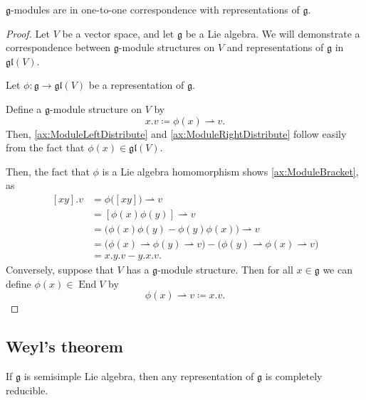 \documentclass{article}
\newcommand{\lb}[1]{\ensuremath{\left[{#1}\right]}}
\DeclareMathOperator{\End}{End}
\newcommand{\frkg}{{\ensuremath{\mathfrak{g}}}}
\newcommand{\glalg}{\ensuremath{\mathfrak{gl}}}
\begin{document}
\begin{proposition}
    $\frkg$-modules are in one-to-one correspondence with representations of $\frkg$.
\end{proposition}

\begin{proof}
    Let $V$ be a vector space, and let $\frkg$ be a Lie algebra.
    We will demonstrate a correspondence between $\frkg$-module structures on $V$ and representations of $\frkg$ in $\glalg(V)$.

    Let $\phi: \frkg \to \glalg(V)$ be a representation of $\frkg$.

    Define a $\frkg$-module structure on $V$ by
    \[
        x.v
        \coloneq
        \phi(x) \rightharpoonup v.
    \]
    Then, \ref{ax:ModuleLeftDistribute} and \ref{ax:ModuleRightDistribute} follow easily from the fact that $\phi(x) \in \glalg(V)$.

    Then, the fact that $\phi$ is a Lie algebra homomorphism shows \ref{ax:ModuleBracket}, as
    \begin{align*}
        \lb{xy}.v
        &=
        \phi\Big(\lb{xy}\Big) \rightharpoonup v
        \\
        &=
        \lb{\phi(x)\phi(y)} \rightharpoonup v
        \\
        &=
        \Big(
            \phi(x)\phi(y) - \phi(y)\phi(x)
        \Big)
        \rightharpoonup v
        \\
        &=
        \Big(
            \phi(x) \rightharpoonup \phi(y) \rightharpoonup v
        \Big) 
        -
        \Big(
            \phi(y) \rightharpoonup \phi(x) \rightharpoonup v
        \Big) 
        \\
        &=
        x.y.v - y.x.v.
    \end{align*}
    Conversely, suppose that $V$ has a $\frkg$-module structure.
    Then for all $x \in \frkg$ we can define $\phi(x) \in \End V$ by
    \[
        \phi(x) \rightharpoonup v
        \coloneq
        x.v.
    \]
\end{proof}


\begin{theorem}
\end{theorem}

\subsection{Weyl's theorem}

\begin{theorem}
    If $\frkg$ is semisimple Lie algebra, then any representation of $\frkg$ is completely reducible.
\end{theorem}
\end{document}
